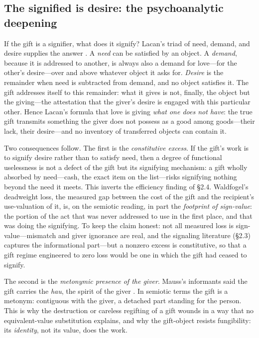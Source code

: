 \subsection{The signified is desire: the psychoanalytic deepening}
\label{p04:sec:lacan}
If the gift is a signifier, what does it signify? Lacan's triad of need,
demand, and desire supplies the answer \parencite{lacan2006}. A \emph{need} can
be satisfied by an object. A \emph{demand}, because it is addressed to
another, is always also a demand for love---for the other's desire---over and
above whatever object it asks for. \emph{Desire} is the remainder when need
is subtracted from demand, and no object satisfies it. The gift addresses
itself to this remainder: what it gives is not, finally, the object but the
giving---the attestation that the giver's desire is engaged with this
particular other. Hence Lacan's formula that love is giving \emph{what one
does not have}: the true gift transmits something the giver does not possess
as a good among goods---their lack, their desire---and no inventory of
transferred objects can contain it.

Two consequences follow. The first is the \emph{constitutive excess}. If the
gift's work is to signify desire rather than to satisfy need, then a degree
of functional uselessness is not a defect of the gift but its signifying
mechanism: a gift wholly absorbed by need---cash, the exact item on the
list---risks signifying nothing beyond the need it meets. This inverts the
efficiency finding of \S2.4. Waldfogel's deadweight loss, the measured gap
between the cost of the gift and the recipient's use-valuation of it, is, on
the semiotic reading, in part the \emph{footprint of sign-value}: the
portion of the act that was never addressed to use in the first place, and
that was doing the signifying. To keep the claim honest: not all measured
loss is sign-value---mismatch and giver ignorance are real, and the
signaling literature (\S2.3) captures the informational part---but a nonzero
excess is constitutive, so that a gift regime engineered to zero loss would
be one in which the gift had ceased to signify.

The second is the \emph{metonymic presence of the giver}. Mauss's informants
said the gift carries the \emph{hau}, the spirit of the giver
\parencite{mauss1925}. In semiotic terms the gift is a metonym: contiguous with
the giver, a detached part standing for the person. This is why the
destruction or careless regifting of a gift wounds in a way that no
equivalent-value substitution explains, and why the gift-object resists
fungibility: its \emph{identity}, not its value, does the work.

